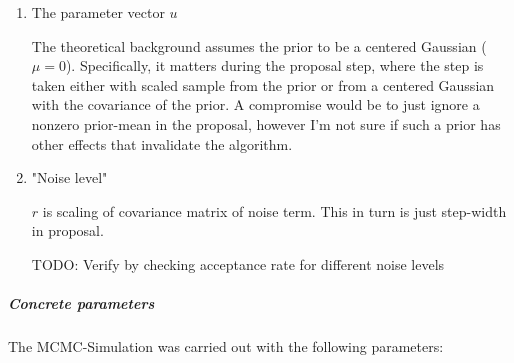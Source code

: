 \documentclass[11pt]{article}
\begin{document}
\begin{enumerate}
\item The parameter vector \(u\)
\label{sec:orge319f69}

The theoretical background assumes the prior to be a centered Gaussian (\(\mu = 0\)).
Specifically, it matters during the proposal step, where the step is taken either with
scaled sample from the prior or from a centered Gaussian with the covariance of the prior.
A compromise would be to just ignore a nonzero prior-mean in the proposal, however I'm not
sure if such a prior has other effects that invalidate the algorithm.

\item "Noise level"
\label{sec:orge93ef41}

\(r\) is scaling of covariance matrix of noise term. This in turn is just step-width in proposal.

TODO: Verify by checking acceptance rate for different noise levels
\end{enumerate}

\subparagraph{Concrete parameters}
\label{sec:orgf7b1e13}

The MCMC-Simulation was carried  out with the following parameters:
\end{document}
